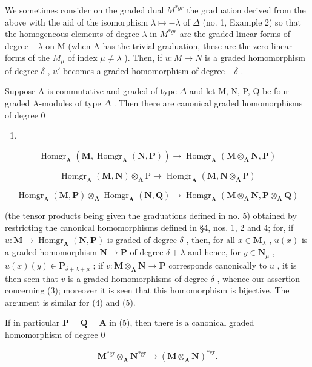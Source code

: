 We sometimes consider on the graded dual \(M^{*gr}\) the graduation derived from the above with the aid of the isomorphism \(\lambda\mapsto-\lambda\) of \(\Delta\) (no. 1, Example 2) so that the homogeneous elements of degree \(\lambda\) in \(M^{*gr}\) are the graded linear forms of degree \(-\lambda\) on M (when A has the trivial graduation, these are the zero linear forms of the \(M_{\mu}\) of index \(\mu\neq\lambda\) ). Then, if \(u:M\to N\) is a graded homomorphism of degree \(\delta\) , \(u'\) becomes a graded homomorphism of degree \(-\delta\) .

Suppose A is commutative and graded of type \(\Delta\) and let M, N, P, Q be four graded A-modules of type \(\Delta\) . Then there are canonical graded homomorphisms of degree 0

\begin{enumerate}
\def\labelenumi{(\arabic{enumi})}
\setcounter{enumi}{2}
\tightlist
\item
\end{enumerate}

\[
\operatorname{Homgr} _ {\mathbf {A}} (\mathbf {M}, \operatorname{Homgr} _ {\mathbf {A}} (\mathbf {N}, \mathbf {P})) \rightarrow \operatorname{Homgr} _ {\mathbf {A}} (\mathbf {M} \otimes_ {\mathbf {A}} \mathbf {N}, \mathbf {P})\tag{4}
\]

\[
\operatorname{Homgr} _ {\mathbf {A}} (\mathbf {M}, \mathbf {N}) \otimes_ {\mathbf {A}} \mathrm{P} \rightarrow \operatorname{Homgr} _ {\mathbf {A}} (\mathbf {M}, \mathbf {N} \otimes_ {\mathbf {A}} \mathrm{P})
\]

\[
\operatorname{Homgr} _ {\mathbf {A}} (\mathbf {M}, \mathbf {P}) \otimes_ {\mathbf {A}} \operatorname{Homgr} _ {\mathbf {A}} (\mathbf {N}, \mathbf {Q}) \rightarrow \operatorname{Homgr} _ {\mathbf {A}} (\mathbf {M} \otimes_ {\mathbf {A}} \mathbf {N}, \mathbf {P} \otimes_ {\mathbf {A}} \mathbf {Q}) \tag {5}
\]

(the tensor products being given the graduations defined in no. 5) obtained by restricting the canonical homomorphisms defined in §4, nos. 1, 2 and 4; for, if \(u: \mathbf{M} \to \operatorname{Homgr}_{\mathbf{A}}(\mathbf{N}, \mathbf{P})\) is graded of degree \(\delta\) , then, for all \(x \in \mathbf{M}_{\lambda}\) , \(u(x)\) is a graded homomorphism \(\mathbf{N} \to \mathbf{P}\) of degree \(\delta + \lambda\) and hence, for \(y \in \mathbf{N}_{\mu}\) , \(u(x)(y) \in \mathbf{P}_{\delta + \lambda + \mu}\) ; if \(v: \mathbf{M} \otimes_{\mathbf{A}} \mathbf{N} \to \mathbf{P}\) corresponds canonically to \(u\) , it is then seen that \(v\) is a graded homomorphisms of degree \(\delta\) , whence our assertion concerning (3); moreover it is seen that this homomorphism is bijective. The argument is similar for (4) and (5).

If in particular \(\mathbf{P} = \mathbf{Q} = \mathbf{A}\) in (5), then there is a canonical graded homomorphism of degree 0

\[
\mathbf {M} ^ {* \mathrm{gr}} \otimes_ {\mathbf {A}} \mathbf {N} ^ {* \mathrm{gr}} \rightarrow (\mathbf {M} \otimes_ {\mathbf {A}} \mathbf {N}) ^ {* \mathrm{gr}}.\tag{6}
\]

